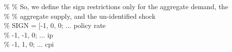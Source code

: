\hspace{1mm}\hspace{5mm} \hspace{5mm} \hspace{5mm} \hspace{5mm} \hspace{5mm} \hspace{5mm} \hspace{5mm} \textcolor{matlabgreen}{\% }\textcolor{matlabgreen}{\% So, we define the sign restrictions only \textcolor{matlabblue}{for} the aggregate demand, the  }\\ 
\hspace{1mm}\hspace{5mm} \hspace{5mm} \hspace{5mm} \hspace{5mm} \hspace{5mm} \hspace{5mm} \hspace{5mm} \hspace{5mm} \textcolor{matlabgreen}{\% }\textcolor{matlabgreen}{\% aggregate supply, and the un-identified shock }\\ 
\hspace{1mm}\hspace{5mm} \hspace{5mm} \hspace{5mm} \hspace{5mm} \hspace{5mm} \hspace{5mm} \hspace{5mm} \hspace{5mm} \textcolor{matlabgreen}{\% SIGN = [-1,       0,      0;        ... policy rate }\\ 
\hspace{1mm}\hspace{5mm} \hspace{5mm} \hspace{5mm} \hspace{5mm} \hspace{5mm} \hspace{5mm} \hspace{5mm} \hspace{5mm} \textcolor{matlabgreen}{\%         -1,      -1,      0;        ... ip         }\\ 
\hspace{1mm}\hspace{5mm} \hspace{5mm} \hspace{5mm} \hspace{5mm} \hspace{5mm} \hspace{5mm} \hspace{5mm} \hspace{5mm} \textcolor{matlabgreen}{\%         -1,       1,      0;        ... cpi }\\ 
